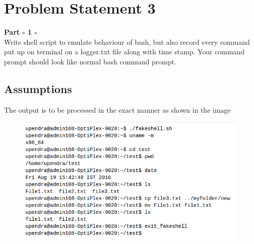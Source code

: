 \documentclass[11pt]{report}
\begin{document}
\section{Problem Statement 3}
\textbf{Part - 1 -}\\
Write shell script to emulate behaviour of bash, but also record every command put up on terminal on a logger.txt file along with time stamp. Your command prompt should look like normal bash command prompt. \\
	\subsection{Assumptions}
	The output is to be processed in the exact manner as shown in the image\\
	\begin{figure}[h!]
	\centering
	\includegraphics[scale=0.7]{images/Selection_004}	
	\end{figure}
	\pagebreak
\end{document}
